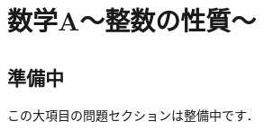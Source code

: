 \documentclass[../../ms_q.tex]{subfiles}
\begin{document}
\section{数学A～整数の性質～}

\subsection*{準備中}
この大項目の問題セクションは整備中です．
\end{document}
